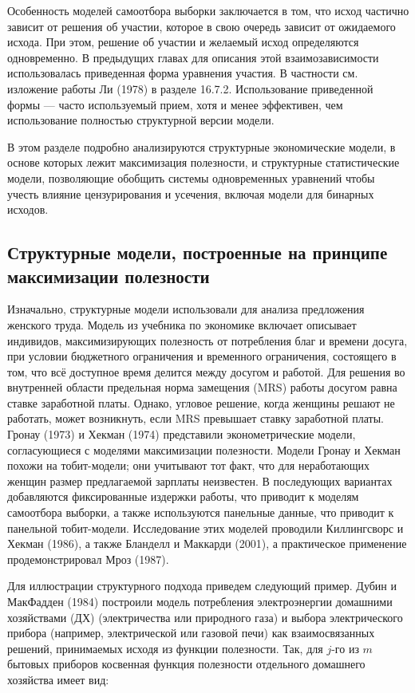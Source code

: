 Особенность моделей  самоотбора выборки заключается в том, что исход частично зависит от решения об участии, которое в свою очередь зависит от ожидаемого исхода. При этом, решение об участии и желаемый исход определяются одновременно. В предыдущих главах для описания этой взаимозависимости использовалась приведенная форма уравнения участия. В частности см. изложение работы Ли (1978) в разделе 16.7.2. Использование приведенной формы --- часто используемый прием, хотя и менее эффективен, чем использование полностью структурной версии модели. 

В этом разделе подробно анализируются структурные экономические модели, в основе которых лежит максимизация полезности, и структурные статистические модели, позволяющие обобщить системы одновременных уравнений чтобы учесть влияние цензурирования и усечения, включая модели для бинарных исходов.

\subsection{Структурные модели, построенные на принципе максимизации полезности}

Изначально, структурные модели использовали для анализа предложения женского труда. Модель из учебника по экономике включает описывает индивидов, максимизирующих полезность от потребления благ и времени досуга, при условии бюджетного ограничения и временного ограничения, состоящего в том, что всё доступное время делится между досугом и работой.
Для решения во внутренней области предельная норма замещения (MRS) работы досугом равна ставке заработной платы. Однако, угловое решение, когда женщины решают не работать, может возникнуть, если MRS превышает ставку заработной платы. Гронау (1973) и Хекман (1974) представили эконометрические модели, согласующиеся с моделями максимизации полезности. Модели Гронау и Хекман похожи на тобит-модели; они учитывают тот факт, что для неработающих женщин размер предлагаемой зарплаты неизвестен. В последующих вариантах добавляются фиксированные издержки работы, что приводит к  моделям самоотбора выборки, а также используются панельные данные, что приводит к панельной тобит-модели. Исследование этих моделей проводили Киллингсворс и Хекман (1986), а также Бланделл и Маккарди (2001), а практическое применение продемонстрировал Мроз (1987).


Для иллюстрации структурного подхода приведем следующий пример. Дубин и МакФадден (1984) построили модель потребления электроэнергии домашними хозяйствами (ДХ) (электричества или природного газа) и выбора электрического прибора (например, электрической или газовой печи) как взаимосвязанных решений, принимаемых исходя из функции полезности. Так, для $j$-го из $m$ бытовых приборов косвенная функция полезности отдельного домашнего хозяйства имеет вид:

